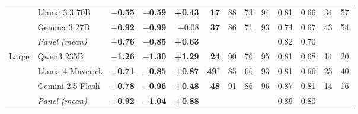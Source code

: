 \begin{table}[t]
\begin{tabular}{@{}ll rrr r rrr rr rr@{}}
 & Llama 3.3 70B & \textbf{$-$0.55} & \textbf{$-$0.59} & \textbf{+0.43} & \textbf{17} & 88 & 73 & 94 & 0.81 & 0.66 & 34 & 57 \\
 & Gemma 3 27B & \textbf{$-$0.92} & \textbf{$-$0.99} & +0.08 & \textbf{37} & 86 & 71 & 93 & 0.74 & 0.67 & 43 & 54 \\
 & \emph{Panel (mean)} & \textbf{$-$0.76} & \textbf{$-$0.85} & \textbf{+0.63} &  &  &  &  & 0.82 & 0.70 &  &  \\
\midrule
Large & Qwen3 235B & \textbf{$-$1.26} & \textbf{$-$1.30} & \textbf{+1.29} & \textbf{24} & 90 & 76 & 95 & 0.81 & 0.68 & 14 & 20 \\
 & Llama 4 Maverick & \textbf{$-$0.71} & \textbf{$-$0.85} & \textbf{+0.87} & \textbf{49}$^\ddagger$ & 85 & 66 & 93 & 0.81 & 0.66 & 25 & 40 \\
 & Gemini 2.5 Flash & \textbf{$-$0.78} & \textbf{$-$0.96} & \textbf{+0.48} & \textbf{48} & 91 & 86 & 96 & 0.87 & 0.81 & 14 & 16 \\
 & \emph{Panel (mean)} & \textbf{$-$0.92} & \textbf{$-$1.04} & \textbf{+0.88} &  &  &  &  & 0.89 & 0.80 &  &  \\
\bottomrule
\end{tabular}
\end{table}